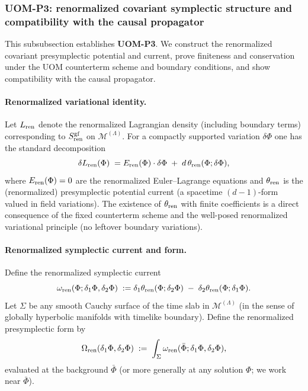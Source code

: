 \documentclass[10pt]{article}
\theoremstyle{definition}
\theoremstyle{plain}
\begin{document}
\subsubsection{UOM-P3: renormalized covariant symplectic structure and compatibility with the causal propagator}
\label{subsubsec:uom-P3}

This subsubsection establishes \textbf{UOM-P3}.  We construct the renormalized covariant presymplectic potential and current,
prove finiteness and conservation under the UOM counterterm scheme and boundary conditions, and show compatibility with the causal propagator.

\paragraph{Renormalized variational identity.}
Let $L_{\rm ren}$ denote the renormalized Lagrangian density (including boundary terms) corresponding to $S_{\rm ren}^{\rm gf}$
on $\mathcal M^{(\Lambda)}$.  For a compactly supported variation $\delta\Phi$ one has the standard decomposition
\begin{equation}
\delta L_{\rm ren}(\Phi)
\;=
E_{\rm ren}(\Phi)\cdot \delta\Phi \; +\; d\,\theta_{\rm ren}(\Phi;\delta\Phi),
\label{eq:var-identity}
\end{equation}
where $E_{\rm ren}(\Phi)=0$ are the renormalized Euler--Lagrange equations and $\theta_{\rm ren}$ is the (renormalized) presymplectic potential
current (a spacetime $(d-1)$-form valued in field variations).  The existence of $\theta_{\rm ren}$ with finite coefficients is a direct
consequence of the fixed counterterm scheme and the well-posed renormalized variational principle (no leftover boundary variations).

\paragraph{Renormalized symplectic current and form.}
Define the renormalized symplectic current
\begin{equation}
\omega_{\rm ren}(\Phi;\delta_1\Phi,\delta_2\Phi)
\;:=
\delta_1\theta_{\rm ren}(\Phi;\delta_2\Phi)\; -\; \delta_2\theta_{\rm ren}(\Phi;\delta_1\Phi).
\label{eq:omega-ren}
\end{equation}
Let $\Sigma$ be any smooth Cauchy surface of the time slab in $\mathcal M^{(\Lambda)}$ (in the sense of globally hyperbolic manifolds with
timelike boundary).  Define the renormalized presymplectic form by
\begin{equation}
\Omega_{\rm ren}(\delta_1\Phi,\delta_2\Phi)
\;:=\;\int_{\Sigma}\omega_{\rm ren}(\bar\Phi;\delta_1\Phi,\delta_2\Phi),
\label{eq:Omega-ren}
\end{equation}
evaluated at the background $\bar\Phi$ (or more generally at any solution $\Phi$; we work near $\bar\Phi$).
\end{document}
